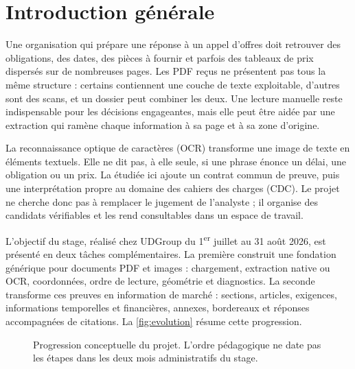 \chapter*{Introduction générale}
Une organisation qui prépare une réponse à un appel d'offres doit retrouver des obligations, des dates, des pièces à fournir et parfois des tableaux de prix dispersés sur de nombreuses pages. Les PDF reçus ne présentent pas tous la même structure : certains contiennent une couche de texte exploitable, d'autres sont des scans, et un dossier peut combiner les deux. Une lecture manuelle reste indispensable pour les décisions engageantes, mais elle peut être aidée par une extraction qui ramène chaque information à sa page et à sa zone d'origine.

La reconnaissance optique de caractères (OCR) transforme une image de texte en éléments textuels. Elle ne dit pas, à elle seule, si une phrase énonce un délai, une obligation ou un prix. La \DI{} étudiée ici ajoute un contrat commun de preuve, puis une interprétation propre au domaine des cahiers des charges (CDC). Le projet ne cherche donc pas à remplacer le jugement de l'analyste ; il organise des candidats vérifiables et les rend consultables dans un espace de travail.

L'objectif du stage, réalisé chez UDGroup du 1\textsuperscript{er} juillet au 31 août 2026, est présenté en deux tâches complémentaires. La première construit une fondation générique pour documents PDF et images : chargement, extraction native ou OCR, coordonnées, ordre de lecture, géométrie et diagnostics. La seconde transforme ces preuves en information de marché : sections, articles, exigences, informations temporelles et financières, annexes, bordereaux et réponses accompagnées de citations. La \autoref{fig:evolution} résume cette progression.

\begin{figure}[htbp]\centering
{}
\caption{Progression conceptuelle du projet. L'ordre pédagogique ne date pas les étapes dans les deux mois administratifs du stage.}\label{fig:evolution}
\end{figure}


